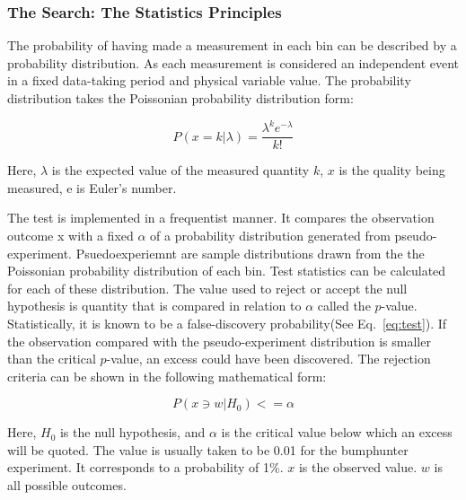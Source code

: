

\subsubsection{The Search: The Statistics Principles}
The probability of having made a measurement in each bin can be described by a probability distribution. As each measurement is considered an independent event in a fixed data-taking period and physical variable value. The probability distribution takes the Poissonian probability distribution form:

\begin{equation}
 P(x=k|\lambda) = \frac{\lambda^{k}e^{-\lambda}}{k!} 
 \label{eq:Poissonian}
\end{equation}

Here, $\lambda$ is the expected value of the measured quantity $k$, $x$ is the quality being measured, e is Euler's number.

The test is implemented in a frequentist manner. It compares the observation outcome x with a fixed $\alpha$ of a probability distribution generated from pseudo-experiment. Psuedoexperiemnt are sample distributions drawn from the the Poissonian probability distribution of each bin. Test statistics can be calculated for each of these distribution. The value used to reject or accept the null hypothesis is quantity that is compared in relation to $\alpha$ called the $p$-value. Statistically, it is known to be a false-discovery probability(See Eq.~\ref{eq:test}). If the observation compared with the pseudo-experiment distribution is smaller than the critical $p$-value, an excess could have been discovered. The rejection criteria can be shown in the following mathematical form:

\begin{equation}
    P(x \ni w|H_0)<= \alpha 
    \label{eq:test}
\end{equation}

Here, $H_0$ is the null hypothesis, and $\alpha$ is the critical value below which an excess will be quoted. The value is usually taken to be 0.01 for the bumphunter experiment. It corresponds to a probability of 1\%. $x$ is the observed value. $w$ is all possible outcomes. 

